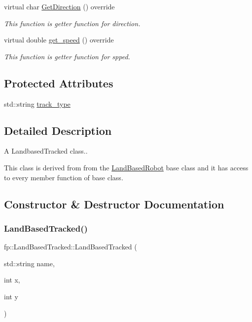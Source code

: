 \begin{DoxyCompactItemize}
virtual char \hyperlink{classfp_1_1_land_based_tracked_acb4201d9ba3660fbdb52bc95cddaa5bf}{Get\+Direction} () override
\begin{DoxyCompactList}\small\item\em This function is getter function for direction. \end{DoxyCompactList}\item 
virtual double \hyperlink{classfp_1_1_land_based_tracked_a5c5c280d150b040bd5f862f2f64d83f1}{get\+\_\+speed} () override
\begin{DoxyCompactList}\small\item\em This function is getter function for spped. \end{DoxyCompactList}\end{DoxyCompactItemize}
\subsection*{Protected Attributes}
\begin{DoxyCompactItemize}
\item 
std\+::string \hyperlink{classfp_1_1_land_based_tracked_a89923d6f493b1581a882f531ed6de3ea}{track\+\_\+type}
\end{DoxyCompactItemize}


\subsection{Detailed Description}
A Landbased\+Tracked class.. 

This class is derived from from the \hyperlink{classfp_1_1_land_based_robot}{Land\+Based\+Robot} base class and it has access to every member function of base class. 

\subsection{Constructor \& Destructor Documentation}
\mbox{\label{classfp_1_1_land_based_tracked_a165b455a487d13eddfd5f015bc579b95}} 
\subsubsection{\texorpdfstring{Land\+Based\+Tracked()}{LandBasedTracked()}\hspace{0.1cm}{\footnotesize\ttfamily [1/2]}}
{\footnotesize\ttfamily fp\+::\+Land\+Based\+Tracked\+::\+Land\+Based\+Tracked (\begin{DoxyParamCaption}\item[{std\+::string}]{name,  }\item[{int}]{x,  }\item[{int}]{y }\end{DoxyParamCaption})}

